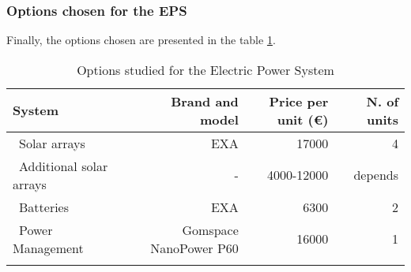 \subsubsection{Options chosen for the EPS}
Finally, the options chosen are presented in the table \ref{epsfinal}.

\begin{longtable}{| l | r | r | r | }
\hline
\rowcolor[gray]{0.80}	\textbf{System} &  \textbf{Brand and model}     & \textbf{Price per unit (\euro)}  & \textbf{N. of units}  \\
\hline
\endfirsthead

	   ~Solar arrays & EXA & 17000 & 4\\
	   ~Additional solar arrays & - & 4000-12000 & depends\\
	   ~Batteries & EXA & 6300 & 2 \\
	   ~Power Management & Gomspace NanoPower P60 & 16000 & 1 \\
	\hline

\caption{Options studied for the Electric Power System}
\label{epsfinal}
\end{longtable}